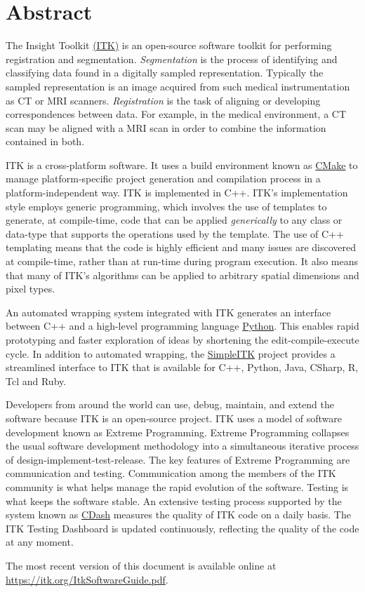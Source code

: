 \chapter*{Abstract}
\noindent
The Insight Toolkit \href{https://itk.org}{(ITK)} is an open-source
software toolkit for performing registration and
segmentation. \emph{Segmentation} is the process of identifying and
classifying data found in a digitally sampled
representation. Typically the sampled representation is an image
acquired from such medical instrumentation as CT or MRI
scanners. \emph{Registration} is the task of aligning or developing
correspondences between data. For example, in the medical environment,
a CT scan may be aligned with a MRI scan in order to combine the
information contained in both.

ITK is a cross-platform software. It uses a build environment known as
\href{http://cmake.org}{CMake} to manage platform-specific project
generation and compilation process in a platform-independent way. ITK is
implemented in C++. ITK's implementation style employs generic programming,
which involves the use of templates to generate, at compile-time, code that can
be applied \emph{generically} to any class or data-type that supports the
operations used by the template. The use of C++ templating means that the code
is highly efficient and many issues are discovered at compile-time, rather than
at run-time during program execution. It also means that many of ITK's
algorithms can be applied to arbitrary spatial dimensions and pixel types.

An automated wrapping system integrated with ITK generates an interface between
C++ and a high-level programming language \href{http://www.python.org}{Python}.
This enables rapid prototyping and faster exploration of ideas by shortening the
edit-compile-execute cycle. In addition to automated
wrapping, the \href{https://www.itk.org/Wiki/SimpleITK}{SimpleITK} project
provides a streamlined interface to ITK that is available for C++, Python, Java,
CSharp, R, Tcl and Ruby.

Developers from around the world can use, debug, maintain, and extend the
software because ITK is an open-source project. ITK uses a
model of software development known as Extreme
Programming. Extreme Programming collapses the usual software development
methodology into a simultaneous iterative process of
design-implement-test-release. The key features of Extreme Programming
are communication and testing. Communication among the members of the
ITK community is what helps manage the rapid evolution of the
software. Testing is what keeps the software stable. An
extensive testing process supported by the system known as
\href{http://open.cdash.org/index.php?project=Insight}{CDash}
measures the quality of ITK code on a daily basis. The ITK Testing Dashboard is
updated continuously, reflecting the quality of the code at any moment.

The most recent version of this document is available online at
\url{https://itk.org/ItkSoftwareGuide.pdf}.
